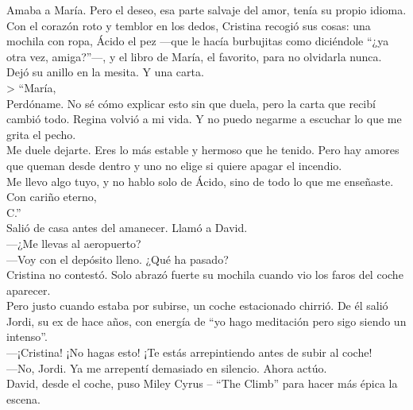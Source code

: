 Amaba a María. Pero el deseo, esa parte salvaje del amor, tenía su propio idioma.\\

Con el corazón roto y temblor en los dedos, Cristina recogió sus cosas: una mochila con ropa, Ácido el pez —que le hacía burbujitas como diciéndole “¿ya otra vez, amiga?”—, y el libro de María, el favorito, para no olvidarla nunca.\\

Dejó su anillo en la mesita. Y una carta.\\

> “María,\\

Perdóname. No sé cómo explicar esto sin que duela, pero la carta que recibí cambió todo. Regina volvió a mi vida. Y no puedo negarme a escuchar lo que me grita el pecho.\\

Me duele dejarte. Eres lo más estable y hermoso que he tenido. Pero hay amores que queman desde dentro y uno no elige si quiere apagar el incendio.\\

Me llevo algo tuyo, y no hablo solo de Ácido, sino de todo lo que me enseñaste.\\

Con cariño eterno,\\
C.”\\

 

Salió de casa antes del amanecer. Llamó a David.\\

—¿Me llevas al aeropuerto?\\
—Voy con el depósito lleno. ¿Qué ha pasado?\\

Cristina no contestó. Solo abrazó fuerte su mochila cuando vio los faros del coche aparecer.\\

Pero justo cuando estaba por subirse, un coche estacionado chirrió. De él salió Jordi, su ex de hace años, con energía de “yo hago meditación pero sigo siendo un intenso”.\\

—¡Cristina! ¡No hagas esto! ¡Te estás arrepintiendo antes de subir al coche!\\
—No, Jordi. Ya me arrepentí demasiado en silencio. Ahora actúo.\\

David, desde el coche, puso Miley Cyrus – “The Climb” para hacer más épica la escena.\\

